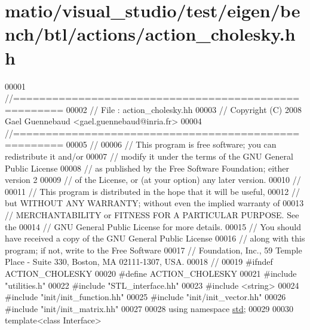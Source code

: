 \hypertarget{matio_2visual__studio_2test_2eigen_2bench_2btl_2actions_2action__cholesky_8hh_source}{}\section{matio/visual\+\_\+studio/test/eigen/bench/btl/actions/action\+\_\+cholesky.hh}
\label{matio_2visual__studio_2test_2eigen_2bench_2btl_2actions_2action__cholesky_8hh_source}

\begin{DoxyCode}
00001 \textcolor{comment}{//=====================================================}
00002 \textcolor{comment}{// File   :  action\_cholesky.hh}
00003 \textcolor{comment}{// Copyright (C) 2008 Gael Guennebaud <gael.guennebaud@inria.fr>}
00004 \textcolor{comment}{//=====================================================}
00005 \textcolor{comment}{//}
00006 \textcolor{comment}{// This program is free software; you can redistribute it and/or}
00007 \textcolor{comment}{// modify it under the terms of the GNU General Public License}
00008 \textcolor{comment}{// as published by the Free Software Foundation; either version 2}
00009 \textcolor{comment}{// of the License, or (at your option) any later version.}
00010 \textcolor{comment}{//}
00011 \textcolor{comment}{// This program is distributed in the hope that it will be useful,}
00012 \textcolor{comment}{// but WITHOUT ANY WARRANTY; without even the implied warranty of}
00013 \textcolor{comment}{// MERCHANTABILITY or FITNESS FOR A PARTICULAR PURPOSE.  See the}
00014 \textcolor{comment}{// GNU General Public License for more details.}
00015 \textcolor{comment}{// You should have received a copy of the GNU General Public License}
00016 \textcolor{comment}{// along with this program; if not, write to the Free Software}
00017 \textcolor{comment}{// Foundation, Inc., 59 Temple Place - Suite 330, Boston, MA  02111-1307, USA.}
00018 \textcolor{comment}{//}
00019 \textcolor{preprocessor}{#ifndef ACTION\_CHOLESKY}
00020 \textcolor{preprocessor}{#define ACTION\_CHOLESKY}
00021 \textcolor{preprocessor}{#include "utilities.h"}
00022 \textcolor{preprocessor}{#include "STL\_interface.hh"}
00023 \textcolor{preprocessor}{#include <string>}
00024 \textcolor{preprocessor}{#include "init/init\_function.hh"}
00025 \textcolor{preprocessor}{#include "init/init\_vector.hh"}
00026 \textcolor{preprocessor}{#include "init/init\_matrix.hh"}
00027 
00028 \textcolor{keyword}{using namespace }\hyperlink{namespacestd}{std};
00029 
00030 \textcolor{keyword}{template}<\textcolor{keyword}{class} Interface>

\end{DoxyCode}
